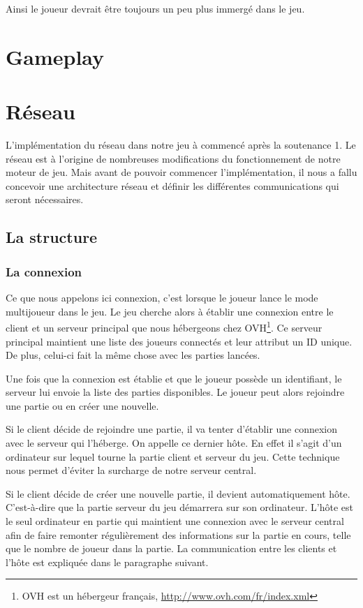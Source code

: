 \documentclass[11pt]{report}
\begin{document}
Ainsi le joueur devrait être toujours un peu plus immergé dans le jeu.

\chapter{Gameplay}



\chapter{Réseau}

L'implémentation du réseau dans notre jeu à commencé après la soutenance 1. Le réseau est à l'origine de nombreuses modifications du fonctionnement de notre moteur de jeu. Mais avant de pouvoir commencer l'implémentation, il nous a fallu concevoir une architecture réseau et définir les différentes communications qui seront nécessaires.

\section{La structure}

\subsection{La connexion}

Ce que nous appelons ici connexion, c'est lorsque le joueur lance le mode multijoueur dans le jeu. Le jeu cherche alors à établir une connexion entre le client et un serveur principal que nous hébergeons chez OVH\footnote{OVH est un hébergeur français, \url{http://www.ovh.com/fr/index.xml}}. Ce serveur principal maintient une liste des joueurs connectés et leur attribut un ID unique. De plus, celui-ci fait la même chose avec les parties lancées.

Une fois que la connexion est établie et que le joueur possède un identifiant, le serveur lui envoie la liste des parties disponibles. Le joueur peut alors rejoindre une partie ou en créer une nouvelle.

Si le client décide de rejoindre une partie, il va tenter d'établir une connexion avec le serveur qui l'héberge. On appelle ce dernier hôte. En effet il s'agit d'un ordinateur sur lequel tourne la partie client et serveur du jeu. Cette technique nous permet d'éviter la surcharge de notre serveur central.

Si le client décide de créer une nouvelle partie, il devient automatiquement hôte. C'est-à-dire que la partie serveur du jeu démarrera sur son ordinateur. L'hôte est le seul ordinateur en partie qui maintient une connexion avec le serveur central afin de faire remonter régulièrement des informations sur la partie en cours, telle que le nombre de joueur dans la partie. La communication entre les clients et l'hôte est expliquée dans le paragraphe suivant.
\end{document}
